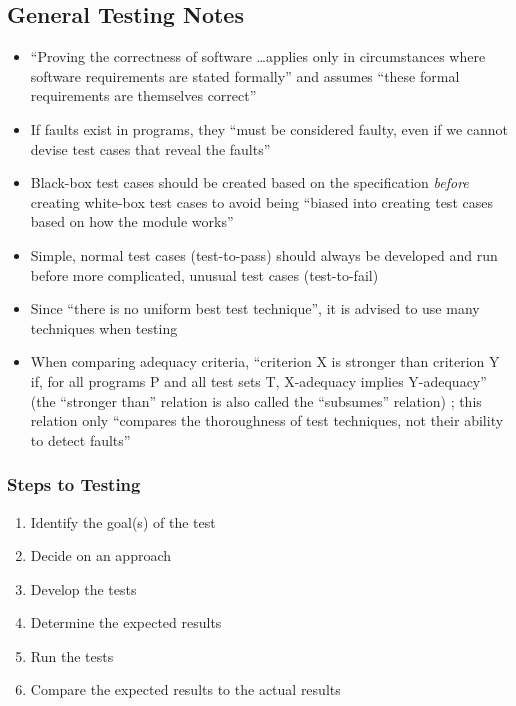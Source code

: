 \subsection{General Testing Notes}

\begin{itemize}
      \item ``Proving the correctness of software \dots applies only in
            circumstances where software requirements are stated formally'' and
            assumes ``these formal requirements are themselves correct''
            \citep[p.~398]{vanVliet2000}
      \item If faults exist in programs, they ``must be considered faulty, even
            if we cannot devise test cases that reveal the faults''
            \citep[p.~401]{vanVliet2000}
      \item Black-box test cases should be created based on the specification
            \emph{before} creating white-box test cases to avoid being ``biased
            into creating test cases based on how the module works''
            \citep[p.~113]{Patton2006}
      \item Simple, normal test cases (test-to-pass) should always be developed
            and run before more complicated, unusual test cases (test-to-fail)
            \citep[p.~66]{Patton2006}
      \item Since ``there is no uniform best test technique'', it is advised to
            use many techniques when testing \citep[p.~440]{vanVliet2000}
      \item When comparing adequacy criteria, ``criterion X is stronger than
            criterion Y if, for all programs P and all test sets T, X-adequacy
            implies Y-adequacy'' (the ``stronger than'' relation is also called
            the ``subsumes'' relation) \citep[p.~432]{vanVliet2000};
            this relation only ``compares the thoroughness of test techniques,
            not their ability to detect faults'' \citep[p.~434]{vanVliet2000}
\end{itemize}

\subsubsection{Steps to Testing \citep[p.~443]{PetersAndPedrycz2000}}
\begin{enumerate}
      \item Identify the goal(s) of the test
      \item Decide on an approach
      \item Develop the tests
      \item Determine the expected results
      \item Run the tests
      \item Compare the expected results to the actual results
\end{enumerate}

